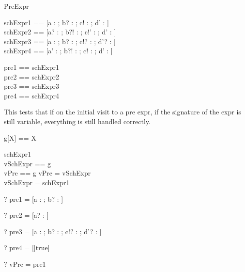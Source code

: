 \begin{zsection}
  \SECTION PreExpr
\end{zsection}

\begin{zed}
  schExpr1 == [a : \nat; b? : \nat; c! : \nat; d' : \nat]\\
  schExpr2 == [a? : \nat; b?! : \nat; c!' : \nat; d' : \nat]\\
  schExpr3 == [a : \nat; b? : \nat; c!? : \nat; d'? : \nat]\\
  schExpr4 == [a' : \nat; b?! : \nat; c! : \nat; d' : \nat]\\
\end{zed}

\begin{zed}
  pre1 == \pre schExpr1\\
  pre2 == \pre schExpr2\\
  pre3 == \pre schExpr3\\
  pre4 == \pre schExpr4\\
\end{zed}

This tests that if on the initial visit to a pre expr, if the
signature of the expr is still variable, everything is still handled
correctly.

\begin{zed}
  g[X] == X
\end{zed}

\begin{axdef}
  schExpr1\\
  vSchExpr == g\\
  vPre == g
\where
  vPre = \pre vSchExpr\\
  vSchExpr = schExpr1
\end{axdef}

\begin{zed} \vdash? pre1 = [a : \nat; b? : \nat] \end{zed}
\begin{zed} \vdash? pre2 = [a? : \nat] \end{zed}
\begin{zed} \vdash? pre3 = [a : \nat; b? : \nat; c!? : \nat; d'? : \nat] \end{zed}
\begin{zed} \vdash? pre4 = [|true] \end{zed}
\begin{zed} \vdash? vPre = pre1 \end{zed}
